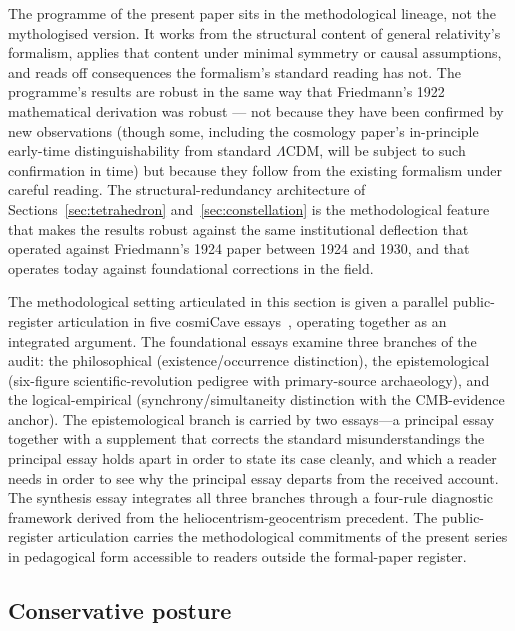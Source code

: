 \documentclass[11pt,a4paper]{article}
\theoremstyle{definition}
\begin{document}
The programme of the present paper sits in the methodological lineage, not the mythologised version. It works from the structural content of general relativity's formalism, applies that content under minimal symmetry or causal assumptions, and reads off consequences the formalism's standard reading has not. The programme's results are robust in the same way that Friedmann's 1922 mathematical derivation was robust --- not because they have been confirmed by new observations (though some, including the cosmology paper's in-principle early-time distinguishability from standard $\Lambda$CDM, will be subject to such confirmation in time) but because they follow from the existing formalism under careful reading. The structural-redundancy architecture of Sections~\ref{sec:tetrahedron} and~\ref{sec:constellation} is the methodological feature that makes the results robust against the same institutional deflection that operated against Friedmann's 1924 paper between 1924 and 1930, and that operates today against foundational corrections in the field.

The methodological setting articulated in this section is given a parallel public-register articulation in five cosmiCave essays~\cite{JanzenFiveD, JanzenShadowReading, JanzenRecordStraight, JanzenWildGoose, JanzenFortress}, operating together as an integrated argument. The foundational essays examine three branches of the audit: the philosophical (existence/occurrence distinction), the epistemological (six-figure scientific-revolution pedigree with primary-source archaeology), and the logical-empirical (synchrony/simultaneity distinction with the CMB-evidence anchor). The epistemological branch is carried by two essays---a principal essay together with a supplement that corrects the standard misunderstandings the principal essay holds apart in order to state its case cleanly, and which a reader needs in order to see why the principal essay departs from the received account. The synthesis essay integrates all three branches through a four-rule diagnostic framework derived from the heliocentrism-geocentrism precedent. The public-register articulation carries the methodological commitments of the present series in pedagogical form accessible to readers outside the formal-paper register.

\subsection{Conservative posture}\label{sec:conservative}
\end{document}
